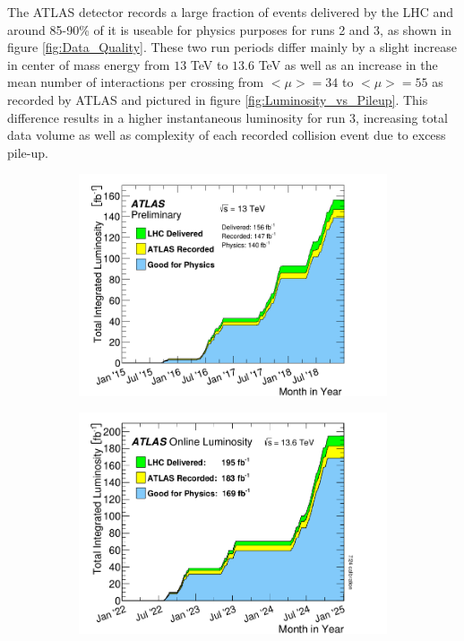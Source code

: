 The ATLAS detector records a large fraction of events delivered by the LHC and around 85-90\% of it is useable for physics 
purposes for runs 2 and 3, as shown in figure \ref{fig:Data_Quality}. These two run periods differ mainly by a slight increase 
in center of mass energy from $13$ TeV to $13.6$ TeV as well as an increase in the mean number of interactions per crossing from 
$<\mu> = 34$ to $<\mu> = 55$ as recorded by ATLAS and pictured in figure \ref{fig:Luminosity_vs_Pileup}. This difference results 
in a higher instantaneous luminosity for run 3, increasing total data volume as well as complexity of each recorded collision 
event due to excess pile-up. \par

\begin{figure}
    \centering
    \begin{subfigure}{.49\textwidth}
        \includegraphics[width=\textwidth]{images/Data_Quality_Run2.png}
        \caption{}
        \label{fig:Data_Quality_Run2}
    \end{subfigure}%
    \begin{subfigure}{.49\textwidth}
        \includegraphics[width=\textwidth]{images/Data_Quality_Run3.png}

\end{subfigure}
\end{figure}
